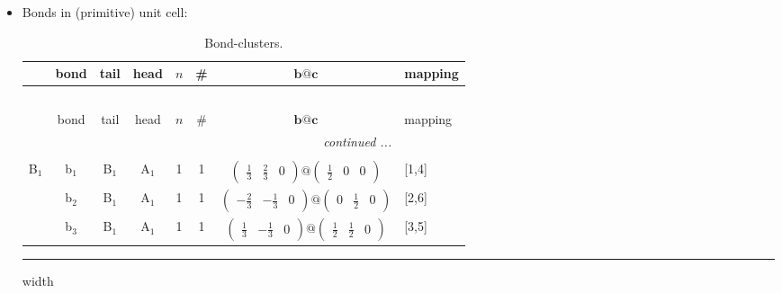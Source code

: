 \documentclass[fleqn,10pt,landscape]{article}
\begin{document}
\begin{itemize}
\item Bonds in (primitive) unit cell:
\begin{center}
\renewcommand{\arraystretch}{1.3}
\begin{longtable}{cc|cc|c|c|c|l}
\caption{Bond-clusters.}
 \\
 \hline \hline
 & bond & tail & head & $n$ & \# & $\bm{b}@\bm{c}$ & mapping \\ \hline \endfirsthead

\multicolumn{7}{l}{\tablename\ \thetable{}} \\
 \hline \hline
 & bond & tail & head & $n$ & \# & $\bm{b}@\bm{c}$ & mapping \\ \hline \endhead

 \hline \hline
\multicolumn{7}{r}{\footnotesize\it continued ...} \\ \endfoot

 \hline \hline
\multicolumn{7}{r}{} \\ \endlastfoot

B$_{1}$ & b$_{1}$ & B$_{1}$ & A$_{1}$ & 1 & 1 & $\begin{pmatrix} \frac{1}{3} & \frac{2}{3} & 0 \end{pmatrix}@\begin{pmatrix} \frac{1}{2} & 0 & 0 \end{pmatrix}$ & [1,4] \\
& b$_{2}$ & B$_{1}$ & A$_{1}$ & 1 & 1 & $\begin{pmatrix} - \frac{2}{3} & - \frac{1}{3} & 0 \end{pmatrix}@\begin{pmatrix} 0 & \frac{1}{2} & 0 \end{pmatrix}$ & [2,6] \\
& b$_{3}$ & B$_{1}$ & A$_{1}$ & 1 & 1 & $\begin{pmatrix} \frac{1}{3} & - \frac{1}{3} & 0 \end{pmatrix}@\begin{pmatrix} \frac{1}{2} & \frac{1}{2} & 0 \end{pmatrix}$ & [3,5] \\
\end{longtable}
\end{center}

 \hfil \hrule height 1mm width \textwidth \hfil


\end{itemize}
\end{document}
